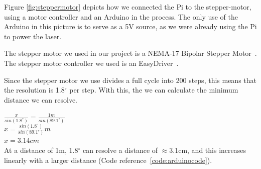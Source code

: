 Figure \ref{fig:steppermotor} depicts how we connected the Pi to the stepper-motor, using a motor controller and an Arduino in the process.
The only use of the Arduino in this picture is to serve as a 5V source, as we were already using the Pi to power the laser.

The stepper motor we used in our project is a NEMA-17 Bipolar Stepper Motor~\cite{steppermotor}.
The stepper motor controller we used is an EasyDriver~\cite{steppercontroller}.



Since the stepper motor we use divides a full cycle into 200 steps, this means that the resolution is 1.8$^\circ$ per step. With this, the we can calculate the minimum distance we can resolve.

$\frac{x}{sin(1.8^\circ)} = \frac{1m}{sin(89.1^\circ)}$ \\
$x = \frac{sin(1.8^\circ)}{sin(89.1^\circ)}m$ \\
$x = 3.14cm$ \\

At a distance of 1m, 1.8$^\circ$ can resolve a distance of $\approx$3.1cm, and this increases linearly with a larger distance (Code reference~\ref{code:arduinocode}).
